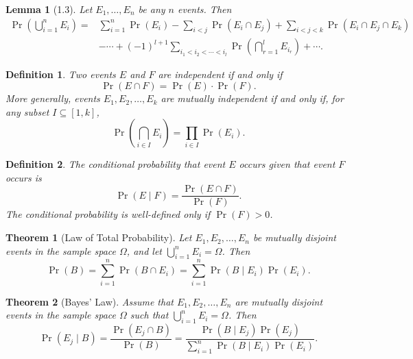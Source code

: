 \documentclass{amsart}
\newtheorem*{definition}{Definition}
\newtheorem*{theorem}{Theorem}
\newtheorem*{lemma}{Lemma}
\begin{document}
\begin{lemma}[1.3]
  Let $E_1, \ldots, E_n$ be any $n$ events. Then
  \begin{align*}
    \Pr \left( \bigcup_{i = 1}^n E_i \right) = & \sum_{i = 1}^n \Pr(E_i) - \sum_{i
    < j} \Pr(E_i \cap E_j) + \sum_{i < j < k} \Pr(E_i \cap E_j \cap E_k) \\
    &- \cdots + {(-1)}^{l + 1} \sum_{i_1 < i_2 < \cdots < i_l} \Pr \left(
    \bigcap_{r = 1}^l E_{i_r} \right) + \cdots.
  \end{align*}
\end{lemma}

\begin{definition}
  Two events $E$ and $F$ are independent if and only if
  \[
    \Pr(E \cap F) = \Pr(E) \cdot \Pr(F).
  \]
  More generally, events $E_1, E_2, \ldots, E_k$ are mutually independent if and
  only if, for any subset $I \subseteq [1, k]$,
  \[
    \Pr \left( \bigcap_{i \in I} E_i \right) = \prod_{i \in I} \Pr(E_i).
  \]
\end{definition}

\begin{definition}
  The conditional probability that event $E$ occurs given that event $F$ occurs
  is
  \[
    \Pr(E \mid F) = \frac{\Pr(E \cap F)}{\Pr(F)}.
  \]
  The conditional probability is well-defined only if $\Pr(F) > 0$.
\end{definition}

\begin{theorem}[Law of Total Probability]
  Let $E_1, E_2, \ldots, E_n$ be mutually disjoint events in the sample space
  $\Omega$, and let $\bigcup_{i = 1}^n E_i = \Omega$. Then
  \[
    \Pr(B) = \sum_{i = 1}^n \Pr(B \cap E_i) = \sum_{i = 1}^n \Pr(B \mid E_i)
    \Pr(E_i).
  \]
\end{theorem}

\begin{theorem}[Bayes' Law]
  Assume that $E_1, E_2, \ldots, E_n$ are mutually disjoint events in the sample
  space $\Omega$ such that $\bigcup_{i = 1}^n E_i = \Omega$. Then
  \[
    \Pr(E_j \mid B) = \frac{\Pr(E_j \cap B)}{\Pr(B)} = \frac{\Pr(B \mid E_j)
    \Pr(E_j)}{\sum_{i = 1}^n \Pr(B \mid E_i) \Pr(E_i)}.
  \]
\end{theorem}
\end{document}
